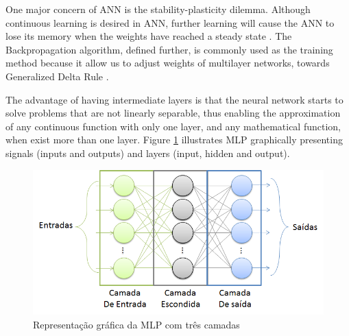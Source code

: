 One major concern of ANN is the stability-plasticity dilemma. Although continuous learning is desired in ANN, further learning will cause the ANN to lose its memory when the weights have reached a steady state \cite{haykin1994neural}. The Backpropagation algorithm, defined further, is commonly used as the training method because it allow us to adjust weights of multilayer networks, towards Generalized Delta Rule \cite{rumelhart1985learning}. 

The advantage of having intermediate layers is that the neural network starts to solve problems that are not linearly separable, thus enabling the approximation of any continuous function with only one layer, and any mathematical function, when exist more than one layer. Figure \ref{fig:mlp} illustrates MLP graphically presenting signals (inputs and outputs) and layers (input, hidden and output).

\begin{figure}[h]
	\centering
	\includegraphics[width=.6\textwidth]{image/mlp.png}
	\caption{Representação gráfica da MLP com três camadas}
	\label{fig:mlp}
\end{figure}

